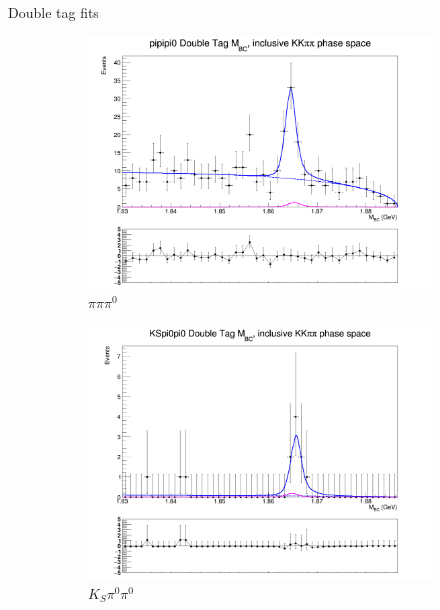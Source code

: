 \documentclass{beamer}
\begin{document}
\begin{frame}{Double tag fits}
\begin{figure}
\begin{subfigure}{0.33\textwidth}
      \centering
      \includegraphics[width=1.0\textwidth]{Plots/DoubleTagYield_DoubleTag_CP_KKpipi_vs_pipipi0_SignalBin0.png}
      \caption{$\pi\pi\pi^0$}
    \end{subfigure}%
    \begin{subfigure}{0.33\textwidth}
      \centering
      \includegraphics[width=1.0\textwidth]{Plots/DoubleTagYield_DoubleTag_CP_KKpipi_vs_KSpi0pi0_SignalBin0.png}
      \caption{$K_S\pi^0\pi^0$}
    \end{subfigure}%
    \begin{subfigure}{0.33\textwidth}
      \centering

\end{subfigure}
\end{figure}
\end{frame}
\end{document}
